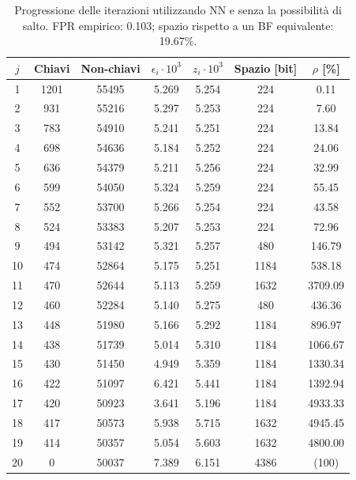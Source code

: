 \begin{table}
\centering
\begin{tabular}{|c|c|c|c|c|c|c|}
\hline
$j$ & Chiavi & Non-chiavi & $\epsilon_i \cdot 10^3$ & $z_i \cdot 10^3$ & Spazio [bit] & $\rho$ [\%] \\
\hline
1  & 1201  & 55495 & 5.269 & 5.254 & 224  & 0.11 \\
2  & 931   & 55216 & 5.297 & 5.253 & 224  & 7.60 \\
3  & 783   & 54910 & 5.241 & 5.251 & 224  & 13.84 \\
4  & 698   & 54636 & 5.184 & 5.252 & 224  & 24.06 \\
5  & 636   & 54379 & 5.211 & 5.256 & 224  & 32.99 \\
6  & 599   & 54050 & 5.324 & 5.259 & 224  & 55.45 \\
7  & 552   & 53700 & 5.266 & 5.254 & 224  & 43.58 \\
8  & 524   & 53383 & 5.207 & 5.253 & 224  & 72.96 \\
9  & 494   & 53142 & 5.321 & 5.257 & 480  & 146.79 \\
10 & 474   & 52864 & 5.175 & 5.251 & 1184 & 538.18 \\
11 & 470   & 52644 & 5.113 & 5.259 & 1632 & 3709.09 \\
12 & 460   & 52284 & 5.140 & 5.275 & 480  & 436.36 \\
13 & 448   & 51980 & 5.166 & 5.292 & 1184 & 896.97 \\
14 & 438   & 51739 & 5.014 & 5.310 & 1184 & 1066.67 \\
15 & 430   & 51450 & 4.949 & 5.359 & 1184 & 1330.34 \\
16 & 422   & 51097 & 6.421 & 5.441 & 1184 & 1392.94 \\
17 & 420   & 50923 & 3.641 & 5.196 & 1184 & 4933.33 \\
18 & 417   & 50573 & 5.938 & 5.715 & 1632 & 4945.45 \\
19 & 414   & 50357 & 5.054 & 5.603 & 1632 & 4800.00 \\
20 & 0    & 50037 & 7.389 & 6.151 & 4386 & (100) \\
\hline
\end{tabular}
\caption{Progressione delle iterazioni utilizzando NN e senza la possibilità di salto. FPR empirico: 0.103; spazio rispetto a un BF equivalente: 19.67\%.}
\label{tab:mlp-no-skip}
\end{table}